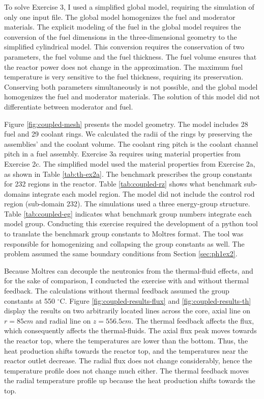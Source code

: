 To solve Exercise 3, I used a simplified global model, requiring the simulation of only one input file.
The global model homogenizes the fuel and moderator materials.
The explicit modeling of the fuel in the global model requires the conversion of the fuel dimensions in the three-dimensional geometry to the simplified cylindrical model.
This conversion requires the conservation of two parameters, the fuel volume and the fuel thickness.
The fuel volume ensures that the reactor power does not change in the approximation.
The maximum fuel temperature is very sensitive to the fuel thickness, requiring its preservation.
Conserving both parameters simultaneously is not possible, and the global model homogenizes the fuel and moderator materials.
The solution of this model did not differentiate between moderator and fuel.

Figure \ref{fig:coupled-mesh} presents the model geometry.
The model includes 28 fuel and 29 coolant rings.
We calculated the radii of the rings by preserving the assemblies' and the coolant volume.
The coolant ring pitch is the coolant channel pitch in a fuel assembly.
Exercise 3a requires using material properties from Exercise 2c.
The simplified model used the material properties from Exercise 2a, as shown in Table \ref{tab:th-ex2a}.
The benchmark prescribes the group constants for 232 regions in the reactor.
Table \ref{tab:coupled-rz} shows what benchmark sub-domains integrate each model region.
The model did not include the control rod region (sub-domain 232).
The simulations used a three energy-group structure.
Table \ref{tab:coupled-eg} indicates what benchmark group numbers integrate each model group.
Conducting this exercise required the development of a python tool to translate the benchmark group constants to Moltres format.
The tool was responsible for homogenizing and collapsing the group constants as well.
The problem assumed the same boundary conditions from Section \ref{sec:ph1ex2}.

Because Moltres can decouple the neutronics from the thermal-fluid effects, and for the sake of comparison, I conducted the exercise with and without thermal feedback.
The calculations without thermal feedback assumed the group constants at 550 $^{\circ}$C.
Figure \ref{fig:coupled-results-flux} and \ref{fig:coupled-results-th} display the results on two arbitrarily located lines across the core, axial line on $r=85 cm$ and radial line on $z=556.5 cm$.
The thermal feedback affects the flux, which consequently affects the thermal-fluids.
The axial flux peak moves towards the reactor top, where the temperatures are lower than the bottom.
Thus, the heat production shifts towards the reactor top, and the temperatures near the reactor outlet decrease.
The radial flux does not change considerably, hence the temperature profile does not change much either.
The thermal feedback moves the radial temperature profile up because the heat production shifts towards the top.

